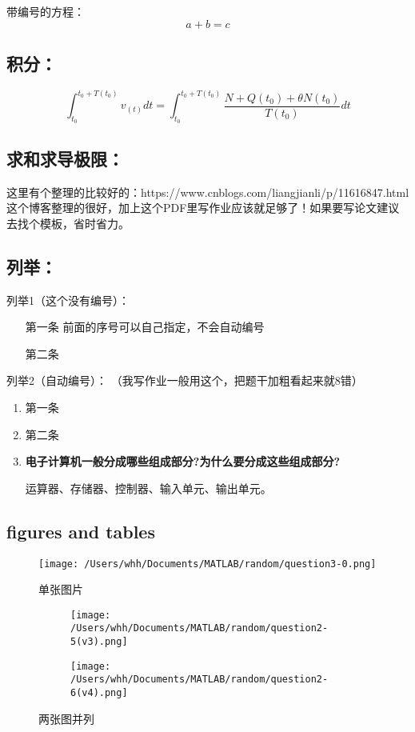 \documentclass[UTF8]{ctexart}
\begin{document}
带编号的方程：
\begin{equation}
a+b=c
\end{equation}
\subsection{积分：} 
$$\displaystyle{\int_{t_0}^{t_0+T(t_0)}} v_{(t)}dt = \displaystyle {\int_{t_0}^{t_0+T(t_0)}} \dfrac{N+Q(t_0)+ \theta N(t_0)}{T(t_0)}dt$$
\subsection{求和求导极限：} 
这里有个整理的比较好的：https://www.cnblogs.com/liangjianli/p/11616847.html
这个博客整理的很好，加上这个PDF里写作业应该就足够了！如果要写论文建议去找个模板，省时省力。
\subsection{列举：} 
列举1（这个没有编号）：
\begin{enumerate}
\item[第一条]前面的序号可以自己指定，不会自动编号
\item[第二条]
\end{enumerate}

列举2（自动编号）：
（我写作业一般用这个，把题干加粗看起来就8错）
\begin{enumerate}
\item 第一条
\item 第二条
\item \textbf{电子计算机一般分成哪些组成部分?为什么要分成这些组成部分?}

运算器、存储器、控制器、输入单元、输出单元。

\end{enumerate}


\subsection{figures and tables}
\begin{figure}[h]
    \centering
      \texttt{[image: /Users/whh/Documents/MATLAB/random/question3-0.png]} 
      \caption{单张图片} 
     \label{fig:q3-0}
  \end{figure}

\begin{figure}[!htp]
    \centering
    \begin{subfigure}
      \centering
      \texttt{[image: /Users/whh/Documents/MATLAB/random/question2-5(v3).png]}
    \end{subfigure}
    \hspace{0.5cm}
    \begin{subfigure}
      \centering
      \texttt{[image: /Users/whh/Documents/MATLAB/random/question2-6(v4).png]}
    \end{subfigure}
    \caption{两张图并列}
    \label{fig:q2-v2}
  \end{figure}
\end{document}
